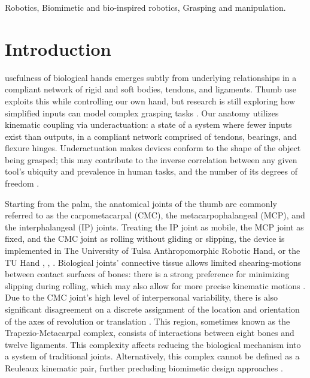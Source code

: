 \documentclass[journal]{IEEEtran}
\begin{document}
\begin{IEEEkeywords}
Robotics, Biomimetic and bio-inspired robotics, Grasping and manipulation.
\end{IEEEkeywords}

\section{Introduction}
 usefulness of biological hands emerges subtly from underlying relationships in a compliant network of rigid and soft bodies, tendons, and ligaments. Thumb use exploits this while controlling our own hand, but research is still exploring how simplified inputs can model complex grasping tasks \cite{moravec}. Our anatomy utilizes kinematic coupling via underactuation: a state of a system where fewer inputs exist than outputs, in a compliant network comprised of tendons, bearings, and flexure hinges. Underactuation makes devices conform to the shape of the object being grasped; this may contribute to the inverse correlation between any given tool's ubiquity and prevalence in human tasks, and the number of its degrees of freedom \cite{Martell, Fuzzy}. %

Starting from the palm, the anatomical joints of the thumb are commonly referred to as the carpometacarpal (CMC), the metacarpophalangeal (MCP), and the interphalangeal (IP) joints. Treating the IP joint as mobile, the MCP joint as fixed, and the CMC joint as rolling without gliding or slipping, the device is implemented in The University of Tulsa Anthropomorphic Robotic Hand, or the TU Hand \cite{Pulleyking}, \cite{Pulleyking-Schultz}, \cite{Das-TUHand}. Biological joints' connective tissue allows limited shearing-motions between contact surfaces of bones: there is a strong preference for minimizing slipping during rolling, which may also allow for more precise kinematic motions \cite{anatomy-textbook}. Due to the CMC joint's high level of interpersonal variability, there is also significant disagreement on a discrete assignment of the location and orientation of the axes of revolution or translation \cite{noparams}. This region, sometimes known as the Trapezio-Metacarpal complex, consists of interactions between eight bones and twelve ligaments. This complexity affects reducing the biological mechanism into a system of traditional joints. Alternatively, this complex cannot be defined as a Reuleaux kinematic pair, further precluding biomimetic design approaches \cite{reuleaux}. 
\end{document}
